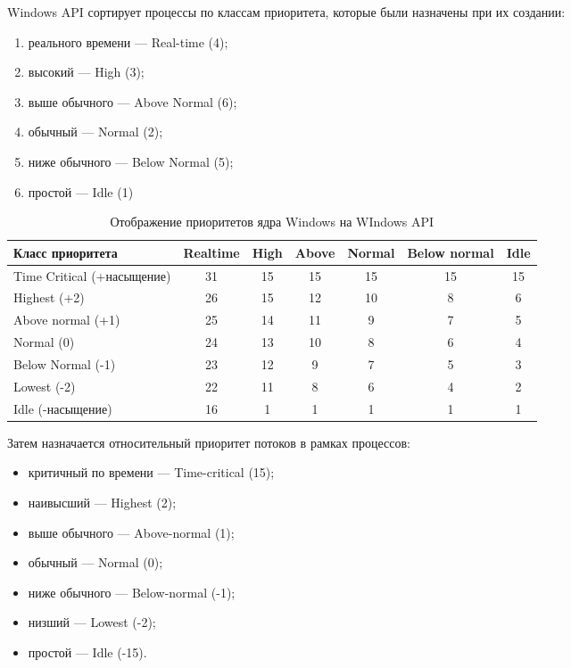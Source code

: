 \documentclass[12pt]{report}
\begin{document}
Windows API сортирует процессы по классам приоритета, которые были назначены при их создании:
\begin{enumerate}
	\item	реального времени — Real-time (4);
	\item	высокий — High (3);
	\item	выше обычного — Above Normal (6);
	\item	обычный — Normal (2);
	\item	ниже обычного — Below Normal (5);
	\item	простой — Idle (1)
\end{enumerate}

\begin{table}[H]
	\centering
	\begin{tabular}{|l| c | c | c | c | c | c |} 
		\hline
		Класс приоритета & Realtime &  High & Above & Normal & Below normal & Idle\\ [0.5ex] 
		\hline\hline
		Time Critical (+насыщение) & 31 & 15 & 15 & 15 & 15 & 15 \\
		\hline
		Highest (+2) & 26 & 15 & 12 & 10 & 8 & 6 \\
		\hline
		Above normal (+1) & 25 & 14 & 11 & 9 & 7 & 5\\
		\hline
		Normal (0) & 24 & 13 & 10 & 8 & 6 & 4\\
		\hline
		Below Normal (-1) & 23 & 12 & 9 & 7 & 5 & 3\\
		\hline
		Lowest (-2) & 22 & 11 & 8 & 6 & 4 & 2\\
		\hline
		Idle (-насыщение) & 16 & 1 & 1 & 1 & 1 & 1\\
		\hline
	\end{tabular}
	\caption{Отображение приоритетов ядра Windows на WIndows API}
\end{table}

\newpage
Затем назначается относительный приоритет потоков в рамках процессов:

\begin{itemize}
	\item	критичный по времени — Time-critical (15);
	\item	наивысший — Highest (2);
	\item	выше обычного — Above-normal (1);
	\item	обычный — Normal (0);
	\item	ниже обычного — Below-normal (-1);
	\item	низший — Lowest (-2);
	\item	простой — Idle (-15).
\end{itemize}
	
\end{document}
